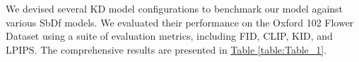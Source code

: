 \documentclass[a4paper,fleqn]{ieeetj}
\begin{document}
We devised several KD model configurations to benchmark our model against various SbDf models. We evaluated their performance on the Oxford 102 Flower Dataset using a suite of evaluation metrics, including FID, CLIP, KID, and LPIPS. The comprehensive results are presented in  \hyperref[table:Table_1]{Table \ref*{table:Table_1}}.
\end{document}
